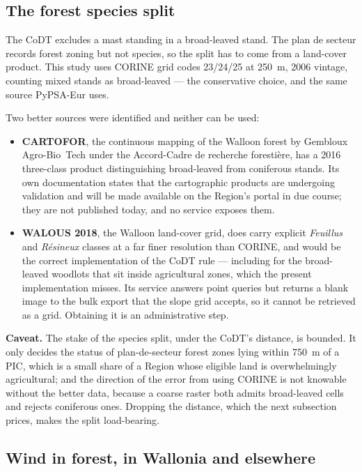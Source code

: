 \documentclass[11pt,a4paper]{article}
\newcommand{\caveat}[1]{\par\medskip\noindent\colorbox{warn!8}{%
  \begin{minipage}{\dimexpr\linewidth-2\fboxsep}\textbf{Caveat.} #1\end{minipage}}\par\medskip}
\begin{document}
\subsection{The forest species split}\label{sec:forest}

The CoDT excludes a mast standing in a broad-leaved stand. The plan de secteur
records forest zoning but not species, so the split has to come from a land-cover
product. This study uses CORINE grid codes 23/24/25 at \SI{250}{\metre}, 2006
vintage, counting mixed stands as broad-leaved --- the conservative choice, and
the same source PyPSA-Eur uses.

Two better sources were identified and neither can be used:

\begin{itemize}
  \item \textbf{CARTOFOR}, the continuous mapping of the Walloon forest by
    Gembloux Agro-Bio~Tech under the Accord-Cadre de recherche forestière, has a
    2016 three-class product distinguishing broad-leaved from coniferous stands.
    Its own documentation states that the cartographic products are undergoing
    validation and will be made available on the Region's portal in due course;
    they are not published today, and no service exposes them.
  \item \textbf{WALOUS 2018}, the Walloon land-cover grid, does carry explicit
    \emph{Feuillus} and \emph{Résineux} classes at a far finer resolution than
    CORINE, and would be the correct implementation of the CoDT rule ---
    including for the broad-leaved woodlots that sit inside agricultural zones,
    which the present implementation misses. Its service answers point queries
    but returns a blank image to the bulk export that the slope grid accepts, so
    it cannot be retrieved as a grid. Obtaining it is an administrative step.
\end{itemize}

\caveat{The stake of the species split, under the CoDT's distance, is bounded.
It only decides the status of plan-de-secteur forest zones lying within
\SI{750}{\metre} of a PIC, which is a small share of a Region whose eligible
land is overwhelmingly agricultural; and the direction of the error from using
CORINE is not knowable without the better data, because a coarse raster both
admits broad-leaved cells and rejects coniferous ones. Dropping the distance,
which the next subsection prices, makes the split load-bearing.}

\subsection{Wind in forest, in Wallonia and elsewhere}\label{sec:forestpractice}
\end{document}
